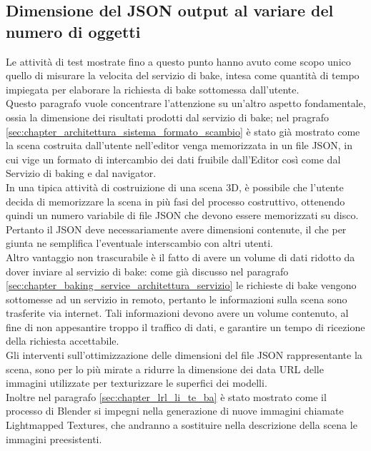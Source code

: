 \subsection{Dimensione del JSON output al variare del numero di oggetti}
\label{sec:chapter_prove_sperimentali_servizio_baking_dim_obj}

Le attività di test mostrate fino a questo punto hanno avuto come scopo unico quello di misurare la velocita del servizio di bake, intesa come quantità di tempo impiegata per elaborare la richiesta di bake sottomessa dall’utente. 
\\
Questo paragrafo vuole concentrare l’attenzione su un’altro aspetto fondamentale, ossia la dimensione dei risultati prodotti dal servizio di bake; nel pragrafo \ref{sec:chapter_architettura_sistema_formato_scambio} è stato già mostrato come la scena costruita dall’utente nell’editor venga memorizzata in un file JSON, in cui vige un formato di intercambio dei dati fruibile dall’Editor così come dal Servizio di baking e dal navigator.
\\
In una tipica attività di costruizione di una scena 3D, è possibile che l’utente decida di memorizzare la scena in più fasi del processo costruttivo, ottenendo quindi un numero variabile di file JSON che devono essere memorizzati su disco. Pertanto il JSON deve necessariamente avere dimensioni contenute, il che per giunta ne semplifica l’eventuale interscambio con altri utenti. 
\\
Altro vantaggio non trascurabile è il fatto di avere un volume di dati ridotto da dover inviare al servizio di bake: come già discusso nel paragrafo \ref{sec:chapter_baking_service_architettura_servizio} le richieste di bake vengono sottomesse ad un servizio in remoto, pertanto le informazioni sulla scena sono trasferite via internet. Tali informazioni devono avere un volume contenuto, al fine di non appesantire troppo il traffico di dati, e garantire un tempo di ricezione della richiesta accettabile. 
\\
Gli interventi sull’ottimizzazione delle dimensioni del file JSON rappresentante la scena, sono per lo più mirate a ridurre la dimensione dei data URL delle immagini utilizzate per texturizzare le superfici dei modelli.
\\
Inoltre nel paragrafo \ref{sec:chapter_lrl_li_te_ba} è stato mostrato come il processo di Blender si impegni nella generazione di nuove immagini chiamate Lightmapped Textures, che andranno a sostituire nella descrizione della scena le immagini preesistenti.
\\
